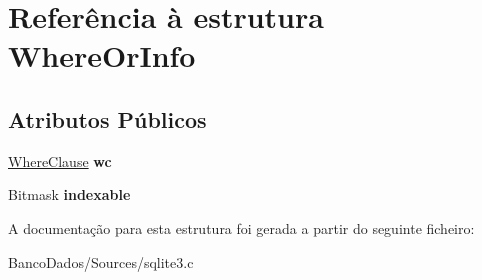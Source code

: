 \hypertarget{struct_where_or_info}{\section{Referência à estrutura Where\-Or\-Info}
\label{struct_where_or_info}
}
\subsection*{Atributos Públicos}
\begin{DoxyCompactItemize}
\item 
\hypertarget{struct_where_or_info_a45bb04e5ea24ec549f060bc8b210ec71}{\hyperlink{struct_where_clause}{Where\-Clause} {\bfseries wc}}\label{struct_where_or_info_a45bb04e5ea24ec549f060bc8b210ec71}

\item 
\hypertarget{struct_where_or_info_a39777f291e1e516f01b05b71a9805357}{Bitmask {\bfseries indexable}}\label{struct_where_or_info_a39777f291e1e516f01b05b71a9805357}

\end{DoxyCompactItemize}


A documentação para esta estrutura foi gerada a partir do seguinte ficheiro\-:\begin{DoxyCompactItemize}
\item 
Banco\-Dados/\-Sources/sqlite3.\-c\end{DoxyCompactItemize}
